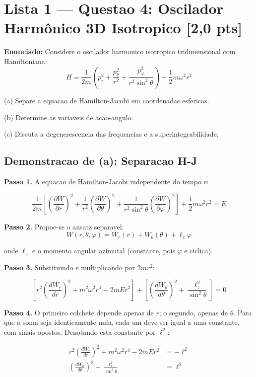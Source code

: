 \documentclass[12pt,a4paper,oneside]{article}
\begin{document}
\section{Lista 1 — Questao 4: Oscilador Harmônico 3D Isotropico [2,0 pts]}

\textbf{Enunciado:} Considere o oscilador harmonico isotropico tridimensional
com Hamiltoniana:
$$H = \frac{1}{2m}\left(p_r^2 + \frac{p_\theta^2}{r^2} +
\frac{p_\varphi^2}{r^2\sin^2\theta}\right) + \frac{1}{2}m\omega^2r^2$$

(a) Separe a equacao de Hamilton-Jacobi em coordenadas esfericas.

(b) Determine as variaveis de acao-angulo.

(c) Discuta a degenerescencia das frequencias e a superintegrabilidade.

\subsection*{Demonstracao de (a): Separacao H-J}

\textbf{Passo 1.} A equacao de Hamilton-Jacobi independente do tempo e:

$$\frac{1}{2m}\left[\left(\frac{\partial W}{\partial r}\right)^2 +
\frac{1}{r^2}\left(\frac{\partial W}{\partial\theta}\right)^2 +
\frac{1}{r^2\sin^2\theta}\left(\frac{\partial W}{\partial\varphi}\right)^2\right]
+ \frac{1}{2}m\omega^2r^2 = E$$

\textbf{Passo 2.} Propoe-se o ansatz separavel:
$$W(r,\theta,\varphi) = W_r(r) + W_\theta(\theta) + \ell_z\varphi$$

onde $\ell_z$ e o momento angular azimutal (constante, pois $\varphi$ e ciclica).

\textbf{Passo 3.} Substituindo e multiplicando por $2mr^2$:

$$\left[r^2\left(\frac{dW_r}{dr}\right)^2 + m^2\omega^2r^4 - 2mEr^2\right] +
\left[\left(\frac{dW_\theta}{d\theta}\right)^2 +
\frac{\ell_z^2}{\sin^2\theta}\right] = 0$$

\textbf{Passo 4.} O primeiro colchete depende apenas de $r$; o segundo, apenas
de $\theta$. Para que a soma seja identicamente nula, cada um deve ser igual
a uma constante, com sinais opostos. Denotando esta constante por $\ell^2$:

\begin{align}
r^2\left(\frac{dW_r}{dr}\right)^2 + m^2\omega^2r^4 - 2mEr^2 &= -\ell^2
\label{eq:osc_radial} \\
\left(\frac{dW_\theta}{d\theta}\right)^2 + \frac{\ell_z^2}{\sin^2\theta}
&= \ell^2 \label{eq:osc_angular}
\end{align}
\end{document}
